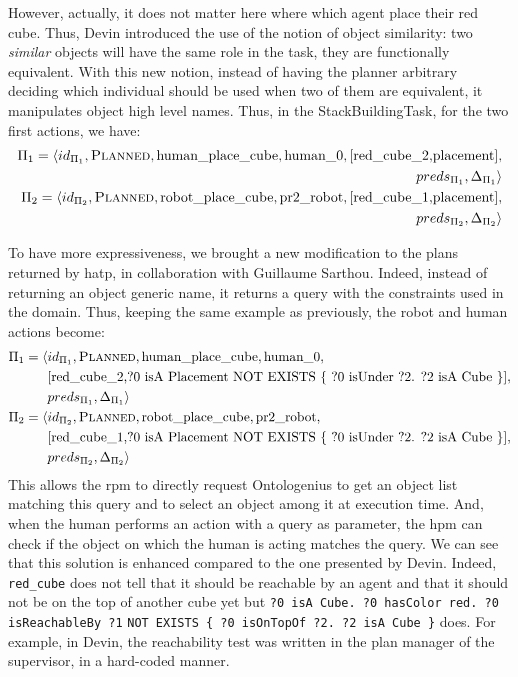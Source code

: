 \documentclass[a4paper,11pt,twoside]{StyleThese}
\begin{document}
However, actually, it does not matter here where which agent place their red cube. Thus, Devin introduced the use of the notion of object similarity: two \emph{similar} objects will have the same role in the task, they are functionally equivalent. With this new notion, instead of having the planner arbitrary deciding which individual should be used when two of them are equivalent, it manipulates object high level names. Thus, in the StackBuildingTask, for the two first actions, we have:
\begin{align*}
\Pi_1=\langle id_{\Pi_1},\textsc{Planned},\text{human\_place\_cube},\text{human\_0}, [\text{red\_cube\_2,placement}],&\\ preds_{\Pi_1},\Delta_{\Pi_1}\rangle&\\
\Pi_2=\langle id_{\Pi_2},\textsc{Planned},\text{robot\_place\_cube},\text{pr2\_robot}, [\text{red\_cube\_1,placement}],&\\ preds_{\Pi_2},\Delta_{\Pi_2}\rangle&
\end{align*}

To have more expressiveness, we brought a new modification to the plans returned by \acrshort{hatp}, in collaboration with Guillaume Sarthou. Indeed, instead of returning an object generic name, it returns a \sparql{} query with the constraints used in the domain. Thus, keeping the same example as previously, the robot and human actions become:
\begin{align*}
\Pi_1=\langle & id_{\Pi_1},\textsc{Planned},\text{human\_place\_cube},\text{human\_0}, \\
&{}[\text{red\_cube\_2,?0 isA Placement NOT EXISTS \{ ?0 isUnder ?2. ?2 isA Cube \}}],\\ &preds_{\Pi_1},\Delta_{\Pi_1}\rangle\\
\Pi_2=\langle & id_{\Pi_2},\textsc{Planned},\text{robot\_place\_cube},\text{pr2\_robot}, \\
&{}[\text{red\_cube\_1,?0 isA Placement NOT EXISTS \{ ?0 isUnder ?2. ?2 isA Cube \}}],\\  &preds_{\Pi_2},\Delta_{\Pi_2}\rangle
\end{align*}
\thispagestyle{example}
This allows the \acrshort{rpm} to directly request Ontologenius to get an object list matching this query and to select an object among it at execution time. And, when the human performs an action with a \sparql{} query as parameter, the \acrshort{hpm} can check if the object on which the human is acting matches the query. We can see that this solution is enhanced compared to the one presented by Devin. Indeed, \verb'red_cube' does not tell that it should be reachable by an agent and that it should not be on the top of another cube yet but \verb'?0 isA Cube. ?0 hasColor red. ?0 isReachableBy ?1' \verb'NOT EXISTS { ?0 isOnTopOf ?2. ?2 isA Cube }' does. For example, in Devin, the reachability test was written in the plan manager of the supervisor, in a hard-coded manner. 
\end{document}
